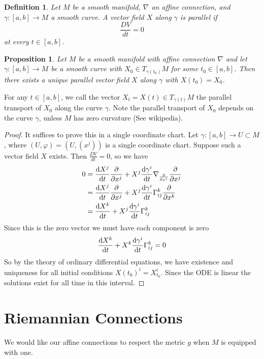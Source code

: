 \documentclass[a4paper]{article}
\newtheorem*{prop}{Proposition}
\newtheorem*{defn}{Definition}
\begin{document}
\begin{defn}
  Let $M$ be a smooth manifold, $\nabla$ an affine connection, and $\gamma: [a,b] \rightarrow M$ a smooth curve. A vector field $X$ along $\gamma$ is parallel if 
  \[
    \frac{DV}{dt} = 0
  \]
  at every $t \in [a,b]$.
\end{defn}

\begin{prop}
  Let $M$ be a smooth manifold with affine connection $\nabla$ and let $\gamma: [a,b] \rightarrow M$ be a smooth curve with $X_0 \in T_{\gamma(t_0)}M$ for some $t_0 \in [a,b]$. Then there exists a unique parallel vector field $X$ along $\gamma$ with $X(t_0) = X_0$.
\end{prop}

For any $t \in [a,b]$, we call the vector $X_t = X(t) \in T_{\gamma(t)}M$ the parallel transport  of $X_0$ along the curve $\gamma$. Note the parallel transport of $X_0$ depends on the curve $\gamma$, unless $M$ has zero curvature (See wikipedia). 

\begin{proof}
  It suffices to prove this in a single coordinate chart. Let $\gamma: [a,b] \rightarrow U \subset M$, where $(U, \varphi) = (U, (x^j))$ is a single coordinate chart. Suppose such a vector field $X$ exists. Then $\frac{DV}{dt} = 0$, so we have
  \[
    \begin{aligned}
      0 &= \dv{X^j}{t} \pdv{x^j} + X^j \dv{\gamma^i}{t} \nabla_{\pdv{x^i}} \pdv{x^j} \\
        &= \dv{X^j}{t} \pdv{x^j} + X^j \dv{\gamma^i}{t} \Gamma_{ij}^k \pdv{x^k} \\
        &= \dv{X^k}{t} + X^j \dv{\gamma^i}{t} \Gamma_{ij}^k \\
    \end{aligned}
  \]
  Since this is the zero vector we must have each component is zero
  \[
    \dv{X^k}{t} + X^k \dv{\gamma^i}{t} \Gamma_{ij}^k = 0
  \]
  So by the theory of ordinary differential equations, we have existence and uniqueness for all initial conditions $X(t_0)^i = X^i_{t_0}$. Since the ODE is linear the solutions exist for all time in this interval.
\end{proof}

\section*{Riemannian Connections}%
We would like our affine connections to respect the metric $g$ when $M$ is equipped with one. 
\end{document}
